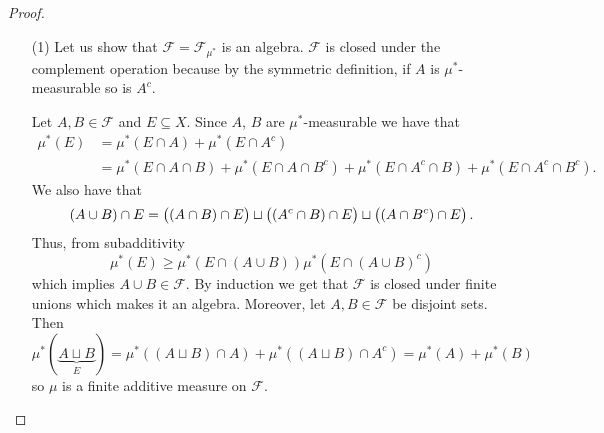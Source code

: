 \documentclass[11pt,a4paper]{article}
\begin{document}
\begin{proof} \phantom{}
\begin{enumerate}
  \item[(1)] Let us show that $\mathcal F = \mathcal F_{\mu^*}$ is an algebra.
  $\mathcal F$ is closed under the complement operation because by the
  symmetric definition, if $A$ is $\mu^*$-measurable so is $A^c$.

  Let $A,B \in \mathcal F$ and $E \subseteq X$.
  Since $A$, $B$ are $\mu^*$-measurable we have that
  \begin{align*}
    \mu^*(E) &= \mu^*(E \cap A) + \mu^*(E \cap A^c) \\ &=
    \mu^*(E \cap A \cap B) + \mu^*(E \cap A \cap B^c) +
    \mu^*(E \cap A^c \cap B) + \mu^*(E \cap A^c \cap B^c).
  \end{align*}
  We also have that
  \[
    (A \cup B) \cap E =
    \del{(A \cap B) \cap E} \sqcup
    \del{(A^c \cap B) \cap E} \sqcup
    \del{(A \cap B^c) \cap E}.
  \]
  Thus, from subadditivity
  \[
    \mu^*(E) \geq \mu^*(E \cap (A \cup B)) \mu^*(E \cap (A \cup B)^c)
  \]
  which implies $A \cup B \in \mathcal F$.
  By induction we get that  $\mathcal F$ is closed under finite unions
  which makes it an algebra.
  Moreover, let $A,B \in \mathcal F$ be disjoint sets. Then
  \[
    \mu^*(\underbrace{A \sqcup B}_{E}) =
    \mu^*((A \sqcup B) \cap A) +
    \mu^*((A \sqcup B) \cap A^c) =
    \mu^*(A) + \mu^*(B)
  \]
  so $\mu$ is a finite additive measure on $\mathcal F$.
  

\end{enumerate}
\end{proof}
\end{document}
